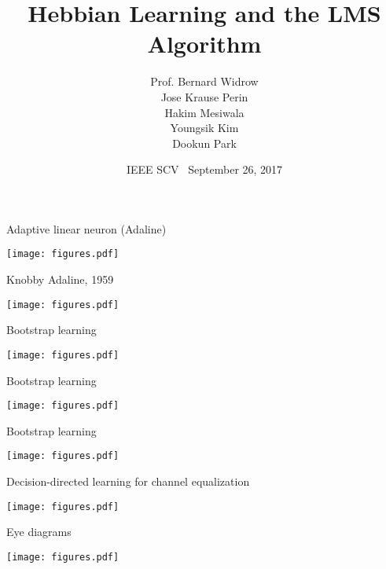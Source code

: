 \documentclass[10pt]{beamer}
\title[The Hebbian-LMS Algorithm]{Hebbian Learning and the LMS Algorithm}
\author{Prof. Bernard Widrow \\ Jose Krause Perin \\ Hakim Mesiwala \\ Youngsik Kim \\ Dookun Park}
\institute{\normalsize Department of Electrical Engineering \\ Stanford University}
\date{IEEE SCV \textbullet~September 26, 2017}
\begin{document}
\begin{frame}
  \titlepage
\end{frame}

\begin{frame}{Adaptive linear neuron (Adaline)}
\begin{center}
	\texttt{[image: figures.pdf]}
\end{center}
\end{frame}

\begin{frame}{Knobby Adaline, 1959}
\begin{center}
	\texttt{[image: figures.pdf]}
\end{center}
\end{frame}

\begin{frame}{Bootstrap learning}
\begin{center}
	\texttt{[image: figures.pdf]}
\end{center}
\end{frame}

\begin{frame}{Bootstrap learning}
\begin{center}
	\texttt{[image: figures.pdf]}
\end{center}
\end{frame}

\begin{frame}{Bootstrap learning}
\begin{center}
	\texttt{[image: figures.pdf]}
\end{center}
\end{frame}

\begin{frame}{Decision-directed learning for channel equalization}
\begin{center}
	\texttt{[image: figures.pdf]}
\end{center}
\end{frame}

\begin{frame}{Eye diagrams}
\begin{center}
	\texttt{[image: figures.pdf]}
\end{center}
\end{frame}
\end{document}
